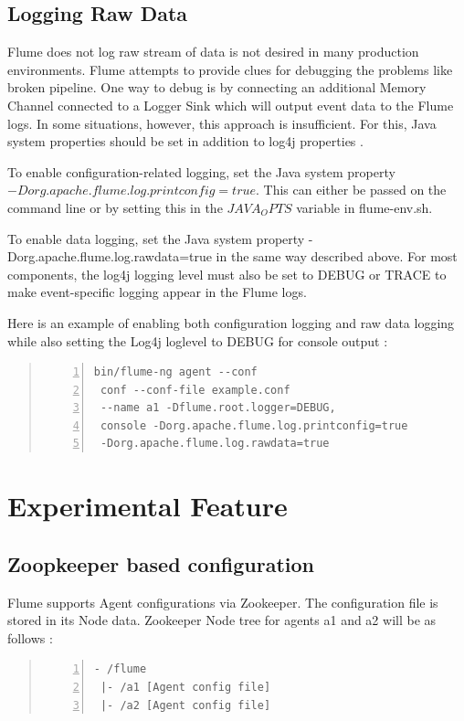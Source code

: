 \documentclass[9pt,twocolumn,twoside]{styles/osajnl}
\begin{document}
\subsection{Logging Raw Data}
Flume does not log raw stream of data is not desired in many production environments. Flume attempts to provide clues for debugging the problems like broken pipeline. One way to debug is by connecting an additional Memory Channel connected to a Logger Sink which will output event data to the Flume logs. In some situations, however, this approach is insufficient. For this, Java system properties should be set in addition to log4j properties \cite{user-manual}.

To enable configuration-related logging, set the Java system property $-Dorg.apache.flume.log.printconfig=true$. This can either be passed on the command line or by setting this in the $JAVA_OPTS$ variable in flume-env.sh.

To enable data logging, set the Java system property -Dorg.apache.flume.log.rawdata=true in the same way described above. For most components, the log4j logging level must also be set to DEBUG or TRACE to make event-specific logging appear in the Flume logs.

Here is an example of enabling both configuration logging and raw data logging while also setting the Log4j loglevel to DEBUG for console output \cite{user-manual}:
\begin{quote}
\begin{Verbatim}[numbers=left]
 bin/flume-ng agent --conf 
 conf --conf-file example.conf 
 --name a1 -Dflume.root.logger=DEBUG,
 console -Dorg.apache.flume.log.printconfig=true 
 -Dorg.apache.flume.log.rawdata=true
\end{Verbatim}
\end{quote}
\section{Experimental Feature}
\subsection{Zoopkeeper based configuration}
Flume supports Agent configurations via Zookeeper. The configuration file is stored in its Node data.  Zookeeper Node tree for agents a1 and a2 will be as follows \cite{user-manual}:
\begin{quote}
\begin{Verbatim}[numbers=left]
- /flume
 |- /a1 [Agent config file]
 |- /a2 [Agent config file]
\end{Verbatim}
\end{quote}
\end{document}
